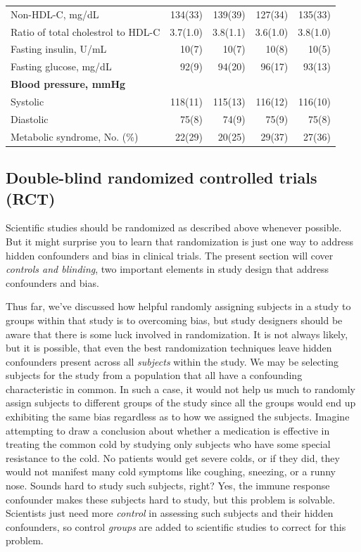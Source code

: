 \documentclass[11pt, chapterprefix=true]{scrbook}\usepackage[]{graphicx}\usepackage[]{color}
\begin{document}
\begin{table}[ht]
\begin{tabular}{@{} lrrrr @{}}
Non-HDL-C, mg/dL       & 134(33) & 139(39) & 127(34) & 135(33) \\
Ratio of total cholestrol to HDL-C & 3.7(1.0) & 3.8(1.1) & 3.6(1.0) & 3.8(1.0) \\
Fasting insulin, U/mL & 10(7) & 10(7) & 10(8) & 10(5) \\
Fasting glucose, mg/dL & 92(9) & 94(20) & 96(17) & 93(13) \\
\textbf{Blood pressure, mmHg} & & & & \\
Systolic & 118(11) & 115(13) & 116(12) & 116(10) \\
Diastolic & 75(8) & 74(9) & 75(9) & 75(8) \\
Metabolic syndrome, No. (\%) & 22(29) & 20(25) & 29(37) & 27(36) \\ \hline
\end{tabular}
\end{table}

\subsection{Double-blind randomized controlled trials (RCT)}

Scientific studies should be randomized as described above whenever possible. But it might surprise you to learn that randomization is just one way to address hidden confounders and bias in clinical trials. The present section will cover \textit{controls and blinding}, two important elements in study design that address confounders and bias.

Thus far, we’ve discussed how helpful randomly assigning subjects in a study to groups within that study is to overcoming bias, but study designers should be aware that there is some luck involved in randomization. It is not always likely, but it is possible, that even the best randomization techniques leave hidden confounders present across all \textit{subjects} within the study. We may be selecting subjects for the study from a population that all have a confounding characteristic in common. In such a case, it would not help us much to randomly assign subjects to different groups of the study since all the groups would end up exhibiting the same bias regardless as to how we assigned the subjects. Imagine attempting to draw a conclusion about whether a medication is effective in treating the common cold by studying only subjects who have some special resistance to the cold. No patients would get severe colds, or if they did, they would not manifest many cold symptoms like coughing, sneezing, or a runny nose. Sounds hard to study such subjects, right? Yes, the immune response confounder makes these subjects hard to study, but this problem is solvable. Scientists just need more \textit{control} in assessing such subjects and their hidden confounders, so control \textit{groups} are added to scientific studies to correct for this problem.
\end{document}
